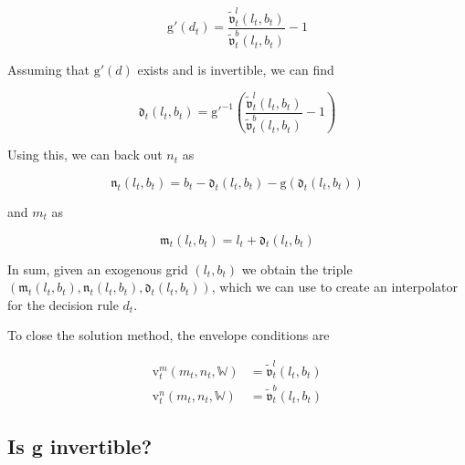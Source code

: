 \documentclass{article}
\newcommand{\bRat}{b}
\newcommand{\vFunc}{\mathrm{v}}
\newcommand{\mRat}{m}
\newcommand{\vOpt}{\tilde{\mathfrak{v}}}
\newcommand{\mEndFunc}{\mathfrak{m}}
\newcommand{\nRat}{n}
\newcommand{\dRat}{d}
\newcommand{\gFunc}{\mathrm{g}}
\newcommand{\lRat}{l}
\newcommand{\dEndFunc}{\mathfrak{d}}
\newcommand{\nEndFunc}{\mathfrak{n}}
\newcommand{\Work}{\mathbb{W}}
\begin{document}
\begin{equation}
\gFunc'(\dRat_{t}) = \frac{\vOpt_{t}^{\lRat}(\lRat_{t},
        \bRat_{t})}{\vOpt_{t}^{\bRat}(\lRat_{t}, \bRat_{t})} - 1
\end{equation}

Assuming that $\gFunc'(\dRat)$ exists and is invertible, we can find

\begin{equation}
\dEndFunc_{t}(\lRat_{t}, \bRat_{t}) = \gFunc'^{-1}\left(
    \frac{\vOpt_{t}^{\lRat}(\lRat_{t},
        \bRat_{t})}{\vOpt_{t}^{\bRat}(\lRat_{t},
        \bRat_{t})} - 1 \right)
\end{equation}

Using this, we can back out $\nRat_{t}$ as

\begin{equation}
\nEndFunc_{t}(\lRat_{t}, \bRat_{t}) = \bRat_{t} -
    \dEndFunc_{t}(\lRat_{t}, \bRat_{t}) - \gFunc(\dEndFunc_{t}(\lRat_{t},
        \bRat_{t}))
\end{equation}

and $\mRat_{t}$ as

\begin{equation}
\mEndFunc_{t}(\lRat_{t}, \bRat_{t}) = \lRat_{t} +
    \dEndFunc_{t}(\lRat_{t}, \bRat_{t})
\end{equation}

In sum, given an exogenous grid $(\lRat_{t}, \bRat_{t})$ we obtain the triple
$\left(\mEndFunc_{t}(\lRat_{t}, \bRat_{t}), \nEndFunc_{t}(\lRat_{t},
        \bRat_{t}), \dEndFunc_{t}(\lRat_{t}, \bRat_{t})\right)$, which
we can use to
create an interpolator for the decision rule $\dRat_{t}$.

To close the solution method, the envelope conditions are

\begin{equation}
\begin{split}
        \vFunc_{t}^{\mRat}(\mRat_{t}, \nRat_{t}, \Work) & =
        \vOpt_{t}^{\lRat}(\lRat_{t}, \bRat_{t}) \\
        \vFunc_{t}^{\nRat}(\mRat_{t}, \nRat_{t}, \Work) & =
        \vOpt_{t}^{\bRat}(\lRat_{t}, \bRat_{t})
    \end{split}
\end{equation}

\subsection{Is g invertible?}\label{Is g invertible?}
\end{document}
